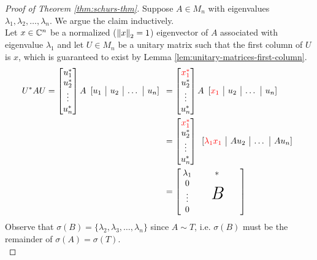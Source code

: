 \begin{proof}[Proof of Theorem \ref{thm:schurs-thm}]
Suppose $A \in M_n$ with eigenvalues $\lambda_1, \lambda_2, \dots, \lambda_n$. We argue the claim inductively. \\

\noindent Let $x \in \mathbb C^n$ be a normalized ($\left\lVert x\right\rVert_2 = 1$) eigenvector of $A$ associated with eigenvalue $\lambda_1$ and let $U \in M_n$ be a unitary matrix such that the first column of $U$ is $x$, which is guaranteed to exist by Lemma \ref{lem:unitary-matrices-first-column}.
\begin{align*}
    U^*AU = \begin{bmatrix}u^*_1 \\ u^*_2 \\ \vdots \\ u^*_n\end{bmatrix} A \begin{array}{c|c|c|c}[u_1 & u_2 & \dots & u_n]\end{array} &= \begin{bmatrix}\red{x^*_1} \\ u^*_2 \\ \vdots \\ u^*_n\end{bmatrix} A \begin{array}{c|c|c|c}[\red{x_1} & u_2 & \dots & u_n]\end{array} \\
          &= \begin{bmatrix}\red{x^*_1} \\ u^*_2 \\ \vdots \\ u^*_n\end{bmatrix} \begin{array}{c|c|c|c}[\red{\lambda_1x_1} & Au_2 & \dots & Au_n]\end{array} \\
          &= \begin{bmatrix} \lambda_1 & & * & & \\ \begin{array}{c} 0 \\ \vdots \\ 0 \end{array} & & \textit{\huge B} & & \end{bmatrix}
\end{align*}
Observe that $\sigma(B) = \{\lambda_2, \lambda_3, \dots, \lambda_n\}$ since $A \sim T$, i.e. $\sigma(B)$ must be the remainder of $\sigma(A) = \sigma(T)$. \\


\end{proof}
